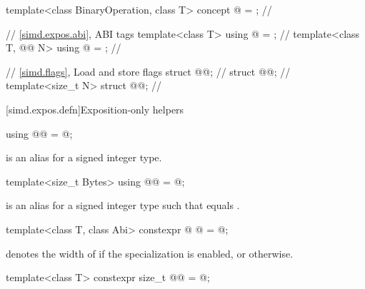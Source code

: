 \begin{codeblock}
template<class BinaryOperation, class T>
  concept @ = \seebelownc@;                    // \expos

// \ref{simd.expos.abi},  ABI tags
template<class T> using @ = \seebelownc@;                      // \expos
template<class T, @@ N> using @ = \seebelownc@;  // \expos

// \ref{simd.flags}, Load and store flags
struct @@;                                                 // \expos
struct @@;                                                 // \expos
template<size_t N> struct @@;                          // \expos
\end{codeblock}

[simd.expos.defn]{Exposition-only helpers}

\begin{itemdecl}
using @@ = @\seebelow@;
\end{itemdecl}

\begin{itemdescr}
\pnum
{} is an alias for a signed integer type.
\end{itemdescr}

\begin{itemdecl}
template<size_t Bytes> using @@ = @\seebelow@;
\end{itemdecl}

\begin{itemdescr}
\pnum
{} is an alias for a signed integer type
 such that  equals .
\end{itemdescr}

\begin{itemdecl}
template<class T, class Abi>
  constexpr @ @ = @\seebelow@;
\end{itemdecl}

\begin{itemdescr}
\pnum
{} denotes the width of  if the specialization  is enabled, or 
otherwise.
\end{itemdescr}

\begin{itemdecl}
template<class T> constexpr size_t @@ = @\seebelow@;
\end{itemdecl}


